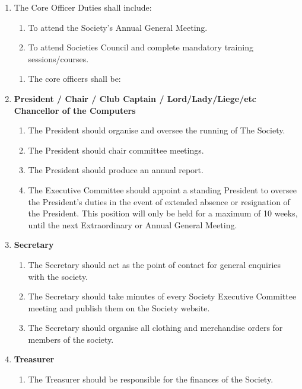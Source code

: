 \documentclass{article}
\begin{document}
\begin{enumerate}
    \begin{enumerate}
        \item The Core Officer Duties shall include:
        \begin{enumerate}
            \item To attend the Society’s Annual General Meeting.
            \item To attend Societies Council and complete mandatory training sessions/courses.
        \end{enumerate}
        \begin{enumerate}[leftmargin=-1cm]
            \item[] The core officers shall be:
        \end{enumerate}
        \item \textbf{President / Chair / Club Captain / Lord/Lady/Liege/etc Chancellor of the Computers}
        \begin{enumerate}
            \item The President should organise and oversee the running of The Society.
            \item The President should chair committee meetings.
            \item The President should produce an annual report.
            \item The Executive Committee should appoint a standing President to oversee the President’s duties in the event of extended absence or resignation of the President. This position will only be held for a maximum of 10 weeks, until the next Extraordinary or Annual General Meeting.
        \end{enumerate}
        \item \textbf{Secretary}
        \begin{enumerate}
            \item The Secretary should act as the point of contact for general enquiries with the society.
            \item The Secretary should take minutes of every Society Executive Committee meeting and publish them on the Society website.
            \item The Secretary should organise all clothing and merchandise orders for members of the society.
        \end{enumerate}
        \item \textbf{Treasurer}
        \begin{enumerate}
            \item The Treasurer should be responsible for the finances of the Society.

\end{enumerate}
\end{enumerate}
\end{enumerate}
\end{document}
